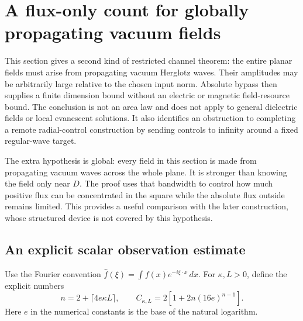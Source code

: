 \section{A flux-only count for globally propagating vacuum fields}
\label{cb:section}

This section gives a second kind of restricted channel theorem: the entire
planar fields must arise from propagating vacuum Herglotz waves. Their
amplitudes may be arbitrarily large relative to the chosen input norm.
Absolute bypass then supplies a finite dimension bound without an electric
or magnetic field-resource bound. The conclusion is not an area law and
does not apply to general dielectric fields or local evanescent solutions.
It also identifies an obstruction to completing a remote radial-control
construction by sending controls to infinity around a fixed regular-wave
target.

The extra hypothesis is global: every field in this section is made from
propagating vacuum waves across the whole plane. It is stronger than knowing
the field only near $D$. The proof uses that bandwidth to control how much
positive flux can be concentrated in the square while the absolute flux
outside remains limited. This provides a useful comparison with the later
construction, whose structured device is not covered by this hypothesis.

\subsection{An explicit scalar observation estimate}

Use the Fourier convention
$\widehat f(\xi)=\int f(x)e^{-i\xi\cdot x}\,dx$.
For $\kappa,L>0$, define the explicit numbers
\begin{equation}
 n=2+\lceil4e\kappa L\rceil,\qquad
 C_{\kappa,L}=2\left[1+2n(16e)^{n-1}\right].
 \label{cb:observationconstant}
\end{equation}
Here $e$ in the numerical constants is the base of the natural logarithm.

